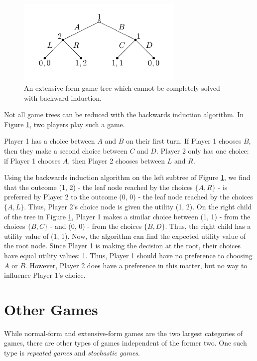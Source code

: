 \begin{figure}[H]
  \centering
  \includegraphics[width=8cm]{figures/NoBackward.png}
  \caption{An extensive-form game tree which cannot be completely solved with backward induction.}
  \label{fig:noBackward}
\end{figure}

Not all game trees can be reduced with the backwards induction algorithm. In Figure \ref{fig:noBackward}, two players play such a game.

\begin{exmp}
  Player 1 has a choice between $A$ and $B$ on their first turn. If Player 1 chooses $B$, then they make a second choice between $C$ and $D$. Player 2 only has one choice: if Player 1 chooses $A$, then Player 2 chooses between $L$ and $R$.
\end{exmp}
Using the backwards induction algorithm on the left subtree of Figure \ref{fig:noBackward}, we find that the outcome (1, 2) - the leaf node reached by the choices $\{A, R\}$ - is preferred by Player 2 to the outcome (0, 0) - the leaf node reached by the choices $\{A, L\}$. Thus, Player 2's choice node is given the utility (1, 2). On the right child of the tree in Figure \ref{fig:noBackward}, Player 1 makes a similar choice between (1, 1) - from the choices $\{B, C\}$ - and (0, 0) - from the choices $\{B, D\}$. Thus, the right child has a utility value of (1, 1). Now, the algorithm can find the expected utility value of the root node. Since Player 1 is making the decision at the root, their choices have equal utility values: 1. Thus, Player 1 should have no preference to choosing $A$ or $B$. However, Player 2 does have a preference in this matter, but no way to influence Player 1's choice.

\section{Other Games}
While normal-form and extensive-form games are the two largest categories of games, there are other types of games independent of the former two. One such type is \textit{repeated games} and \textit{stochastic games}.\\

